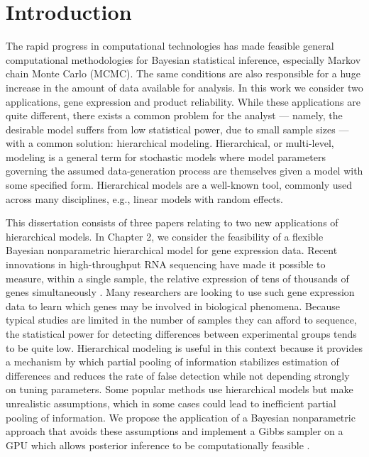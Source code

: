 \chapter{Introduction}
The rapid progress in computational technologies has made feasible general computational methodologies for Bayesian statistical inference, especially Markov chain Monte Carlo (MCMC). The same conditions are also responsible for a huge increase in the amount of data available for analysis. In this work we consider two applications, gene expression and product reliability. While these applications are quite different, there exists a common problem for the analyst --- namely, the desirable model suffers from low statistical power, due to small sample sizes --- with a common solution: hierarchical modeling. Hierarchical, or multi-level, modeling is a general term for stochastic models where model parameters governing the assumed data-generation process are themselves given a model with some specified form. Hierarchical models are a well-known tool, commonly used across many disciplines, e.g., linear models with random effects.

This dissertation consists of three papers relating to two new applications of hierarchical models. In Chapter 2, we consider the feasibility of a flexible Bayesian nonparametric hierarchical model for gene expression data. Recent innovations in high-throughput RNA sequencing have made it possible to measure, within a single sample, the relative expression of tens of thousands of genes simultaneously \citep{wang2009rna}. Many researchers are looking to use such gene expression data to learn which genes may be involved in biological phenomena. Because typical studies are limited in the number of samples they can afford to sequence, the statistical power for detecting differences between experimental groups tends to be quite low. Hierarchical modeling is useful in this context because it provides a mechanism by which partial pooling of information stabilizes estimation of differences and reduces the rate of false detection while not depending strongly on tuning parameters. Some popular methods use hierarchical models but make unrealistic assumptions, which in some cases could lead to inefficient partial pooling of information. We propose the application of a Bayesian nonparametric approach \citep{ishwaran2001,liu} that avoids these assumptions and implement a Gibbs sampler on a GPU which allows posterior inference to be computationally feasible \citep{suchard,landau}.

